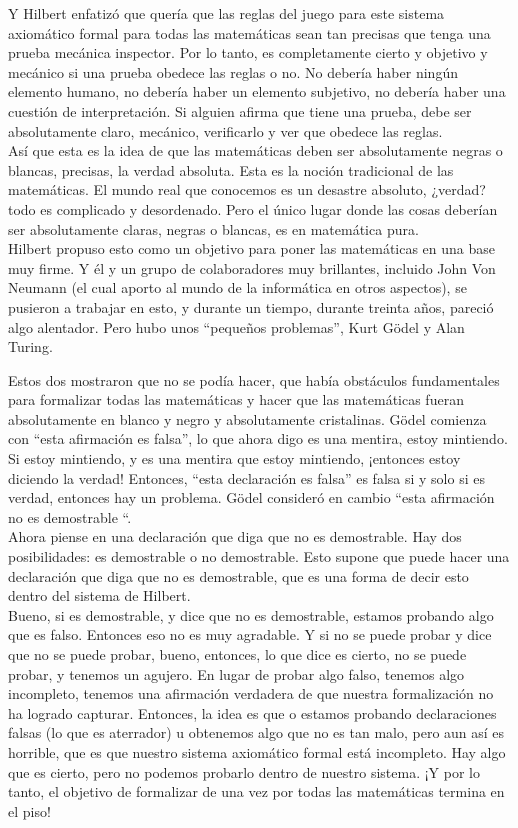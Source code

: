 \documentclass{article}
\begin{document}
\vspace{2mm}

Y Hilbert enfatizó que quería que las reglas del juego para este sistema axiomático formal para todas las matemáticas sean tan precisas que tenga una prueba mecánica inspector. Por lo tanto, es completamente cierto y objetivo y mecánico si una prueba obedece las reglas o no. No debería haber ningún elemento humano, no debería haber un elemento subjetivo, no debería haber una cuestión de interpretación. Si alguien afirma que tiene una prueba, debe ser absolutamente claro, mecánico, verificarlo y ver que obedece las reglas.\\
Así que esta es la idea de que las matemáticas deben ser absolutamente negras o blancas, precisas, la verdad absoluta. Esta es la noción tradicional de las matemáticas.
El mundo real que conocemos es un desastre absoluto, ¿verdad? todo es complicado y desordenado. Pero el único lugar donde las cosas deberían ser absolutamente claras, negras o blancas, es en matemática pura.\\
Hilbert propuso esto como un objetivo para poner las matemáticas en una base muy firme. Y él y un grupo de colaboradores muy brillantes, incluido John Von Neumann (el cual aporto al mundo de la informática en otros aspectos), se pusieron a trabajar en esto, y durante un tiempo, durante treinta años, pareció algo alentador. Pero hubo unos “pequeños problemas”, Kurt Gödel y Alan Turing.

\vspace{2mm}

Estos dos mostraron que no se podía hacer, que había obstáculos fundamentales para formalizar todas las matemáticas y hacer que las matemáticas fueran absolutamente en blanco y negro y absolutamente cristalinas. Gödel comienza con “esta afirmación es falsa”, lo que ahora digo es una mentira, estoy mintiendo. Si estoy mintiendo, y es una mentira que estoy mintiendo, ¡entonces estoy diciendo la verdad! Entonces, “esta declaración es falsa” es falsa si y solo si es verdad, entonces hay un problema. Gödel consideró en cambio “esta afirmación no es demostrable “.\\
Ahora piense en una declaración que diga que no es demostrable. Hay dos posibilidades: es demostrable o no demostrable. Esto supone que puede hacer una declaración que diga que no es demostrable, que es una forma de decir esto dentro del sistema de Hilbert.\\
Bueno, si es demostrable, y dice que no es demostrable, estamos probando algo que es falso. Entonces eso no es muy agradable. Y si no se puede probar y dice que no se puede probar, bueno, entonces, lo que dice es cierto, no se puede probar, y tenemos un agujero. En lugar de probar algo falso, tenemos algo incompleto, tenemos una afirmación verdadera de que nuestra formalización no ha logrado capturar. Entonces, la idea es que o estamos probando declaraciones falsas (lo que es aterrador) u obtenemos algo que no es tan malo, pero aun así es horrible, que es que nuestro sistema axiomático formal está incompleto. Hay algo que es cierto, pero no podemos probarlo dentro de nuestro sistema. ¡Y por lo tanto, el objetivo de formalizar de una vez por todas las matemáticas termina en el piso!
\end{document}
